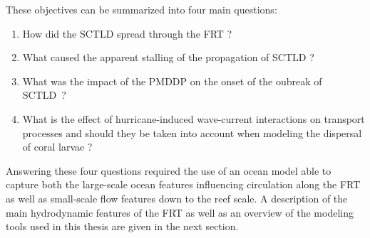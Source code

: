 These objectives can be summarized into four main questions:
\begin{enumerate}
    \item How did the SCTLD spread through the FRT ?
    \item What caused the apparent stalling of the propagation of SCTLD ? 
    \item What was the impact of the PMDDP on the onset of the oubreak of SCTLD~?
    \item  What is the effect of hurricane-induced wave-current interactions on transport processes and should they be taken into account when modeling the dispersal of coral larvae ?
\end{enumerate}     
Answering these four questions required the use of an ocean model able to capture both the large-scale ocean features influencing circulation along the FRT as well as small-scale flow features down to the reef scale. A description of the main hydrodynamic features of the FRT as well as an overview of the modeling tools used in this thesis are given in the next section.

